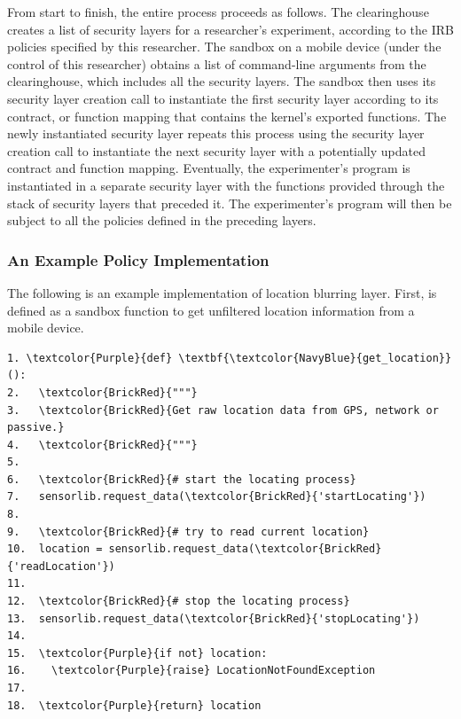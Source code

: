 From start to finish, the entire process proceeds as follows. 
The clearinghouse creates a list of security layers for a researcher's
experiment, according to the IRB policies specified by this 
researcher. The sandbox on a mobile device (under the control of
this researcher) obtains a list of command-line arguments 
from the clearinghouse, which includes all the security layers.
The sandbox then uses its security layer creation call to instantiate 
the first security layer according to its contract, or function 
mapping that contains the kernel's exported functions.
The newly instantiated
security layer repeats this process using the 
security layer creation call to instantiate the next
security layer with a potentially updated contract and function
mapping. Eventually, the experimenter's program is instantiated
in a separate security layer with the functions provided
through the stack of security layers that preceded it.
The experimenter's program will then be subject to all the 
policies defined in the preceding layers.

\subsubsection{An Example Policy Implementation}
\label{sec-precision-example}


The following is an example implementation of location blurring layer. First, 
is defined as a sandbox function to get unfiltered location information from a mobile device. 

\begin{Verbatim}
1. \textcolor{Purple}{def} \textbf{\textcolor{NavyBlue}{get_location}}():
2.   \textcolor{BrickRed}{"""}
3.   \textcolor{BrickRed}{Get raw location data from GPS, network or passive.}
4.   \textcolor{BrickRed}{"""}
5. 
6.   \textcolor{BrickRed}{# start the locating process} 
7.   sensorlib.request_data(\textcolor{BrickRed}{'startLocating'})
8.
9.   \textcolor{BrickRed}{# try to read current location}
10.  location = sensorlib.request_data(\textcolor{BrickRed}{'readLocation'})
11.
12.  \textcolor{BrickRed}{# stop the locating process} 
13.  sensorlib.request_data(\textcolor{BrickRed}{'stopLocating'})
14.
15.  \textcolor{Purple}{if not} location:
16.    \textcolor{Purple}{raise} LocationNotFoundException    
17.  
18.  \textcolor{Purple}{return} location
\end{Verbatim}

